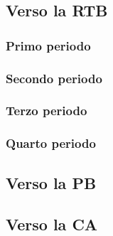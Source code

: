 \subsection{Verso la RTB}
\subsubsection{Primo periodo}
\subsubsection{Secondo periodo}
\subsubsection{Terzo periodo}
\subsubsection{Quarto periodo}

\subsection{Verso la PB}

\subsection{Verso la CA}
